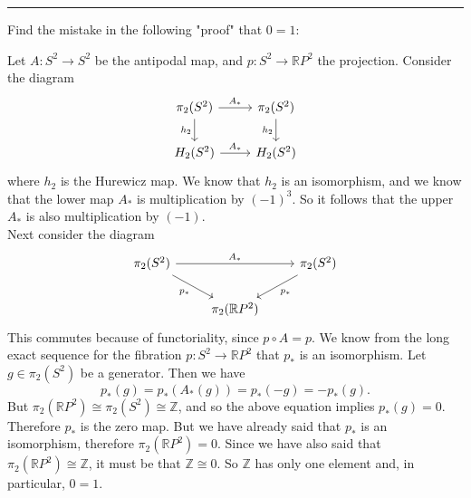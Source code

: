 \documentclass[letterpaper, 12pt]{article}
\begin{document}
\noindent\rule{7in}{2.8pt}
\begin{problem}{6}
Find the mistake in the following "proof" that \(0=1\):

Let \(A:S^2\rightarrow S^2\) be the antipodal map, and \(p:S^2\rightarrow \mathbb{R}P^2\) the projection. Consider the diagram 
\[\begin{tikzcd}
	{\pi_2(S^2)} & {\pi_2(S^2)} \\
	{H_2(S^2)} & {H_2(S^2)}
	\arrow["{A_*}", from=1-1, to=1-2]
	\arrow["{h_2}"', from=1-1, to=2-1]
	\arrow["{h_2}"', from=1-2, to=2-2]
	\arrow["{A_*}", from=2-1, to=2-2]
\end{tikzcd}\]
where \(h_2\) is the Hurewicz map. We know that \(h_2\) is an isomorphism, and we know that the lower map \(A_*\) is multiplication by \((-1)^3\). So it follows that the upper \(A_*\) is also multiplication by \((-1)\). \\ 
Next consider the diagram 
\[\begin{tikzcd}
	{\pi_2(S^2)} && {\pi_2(S^2)} \\
	& {\pi_2(\mathbb{R}P^2)}
	\arrow["{A_*}", from=1-1, to=1-3]
	\arrow["{p_*}"', from=1-1, to=2-2]
	\arrow["{p_*}", from=1-3, to=2-2]
\end{tikzcd}\]
This commutes because of functoriality, since \(p\circ A=p\). We know from the long exact sequence for the fibration \(p:S^2\rightarrow \mathbb{R}P^2\) that \(p_*\) is an isomorphism. Let \(g\in \pi_2(S^2)\) be a generator. Then we have 
\[p_*(g)=p_*(A_*(g))=p_*(-g)=-p_*(g).\]
But \(\pi_2(\mathbb{R}P^2)\cong \pi_2(S^2)\cong \mathbb{Z}\), and so the above equation implies \(p_*(g)=0\). Therefore \(p_*\) is the zero map. But we have already said that \(p_*\) is an isomorphism, therefore \(\pi_2(\mathbb{R}P^2)=0\). Since we have also said that \(\pi_2(\mathbb{R}P^2)\cong \mathbb{Z}\), it must be that \(\mathbb{Z}\cong 0\). So \(\mathbb{Z}\) has only one element and, in particular, \(0=1\). 
\end{problem}
\begin{solution}

\end{solution}
\end{document}
